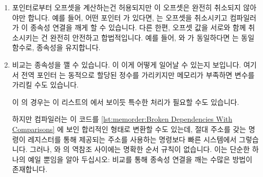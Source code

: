 \begin{enumerate}
\item	포인터로부터 오프셋을 계산하는건 허용되지만 이 오프셋은 완전히 취소되지
	않아야만 합니다.
	예를 들어, 어떤  포인터  가 있다면,
	 는 오프셋을 취소시키고 컴파일러가 이 종속성
	연결을 깨게 할 수 있습니다.
	다른 한편, 오프셋 값을 서로와 함께 취소시키는 건 완전히 안전하고
	합법적입니다.
	예를 들어,  와  가 동일하다면  는 동일 함수로,
	종속성을 유지합니다.

\item	비교는 종속성을 깰 수 있습니다.
	이 이게 어떻게 일어날 수 있는지 보입니다.
	여기서 전역 포인터  는 동적으로 할당된 정수를 가리키지만
	메모리가 부족하면  변수를 가리킬 수도 있습니다.
	\begin{fcvref}
	이  의 경우는 이 리스트의  에서
	보이듯 특수한 처리가 필요할 수도 있습니다.
	\end{fcvref}
        \begin{fcvref}
	하지만 컴파일러는 이 코드를
	\cref{lst:memorder:Broken Dependencies With Comparisons}
	에 보인 합리적인 형태로 변환할 수도 있는데, 절대 주소를 갖는 명령이
	레지스터를 통해 제공되는 주소를 사용하는 명령보다 빠른 시스템에서
	그렇습니다.
	그러나,  와  의 역참조 사이에는 명확한
	순서 규칙이 없습니다.
	이는 단순한 하나의 예일 뿐임을 알아 두십시오: 비교를 통해 종속성 연결을
	깨는 수많은 방법이 존재합니다.
	\end{fcvref}

\iffalse


\end{enumerate}
